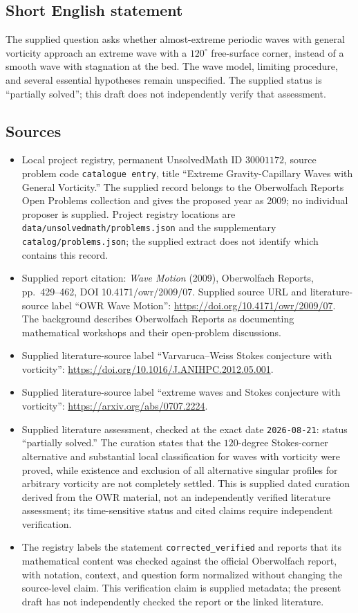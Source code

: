 \documentclass[11pt]{article}
\begin{document}
\subsection{Short English statement}
The supplied question asks whether almost-extreme periodic waves with general vorticity approach an extreme wave with a $120^\circ$ free-surface corner, instead of a smooth wave with stagnation at the bed. The wave model, limiting procedure, and several essential hypotheses remain unspecified. The supplied status is ``partially solved''; this draft does not independently verify that assessment.
\subsection{Sources}
\begin{itemize}
\item Local project registry, permanent UnsolvedMath ID $30001172$, source problem code \texttt{catalogue entry}, title ``Extreme Gravity-Capillary Waves with General Vorticity.'' The supplied record belongs to the Oberwolfach Reports Open Problems collection and gives the proposed year as 2009; no individual proposer is supplied. Project registry locations are \texttt{data/unsolvedmath/problems.json} and the supplementary \texttt{catalog/problems.json}; the supplied extract does not identify which contains this record.
\item Supplied report citation: \emph{Wave Motion} (2009), Oberwolfach Reports, pp.~429--462, DOI 10.4171/owr/2009/07. Supplied source URL and literature-source label ``OWR Wave Motion'': \url{https://doi.org/10.4171/owr/2009/07}. The background describes Oberwolfach Reports as documenting mathematical workshops and their open-problem discussions.
\item Supplied literature-source label ``Varvaruca--Weiss Stokes conjecture with vorticity'': \url{https://doi.org/10.1016/J.ANIHPC.2012.05.001}.
\item Supplied literature-source label ``extreme waves and Stokes conjecture with vorticity'': \url{https://arxiv.org/abs/0707.2224}.
\item Supplied literature assessment, checked at the exact date \texttt{2026-08-21}: status ``partially solved.'' The curation states that the $120$-degree Stokes-corner alternative and substantial local classification for waves with vorticity were proved, while existence and exclusion of all alternative singular profiles for arbitrary vorticity are not completely settled. This is supplied dated curation derived from the OWR material, not an independently verified literature assessment; its time-sensitive status and cited claims require independent verification.
\item The registry labels the statement \texttt{corrected\_verified} and reports that its mathematical content was checked against the official Oberwolfach report, with notation, context, and question form normalized without changing the source-level claim. This verification claim is supplied metadata; the present draft has not independently checked the report or the linked literature.
\end{itemize}
\end{document}
